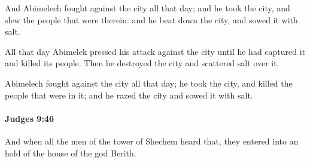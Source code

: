 			\begin{versebox}
					\item[BHS] 
					\item[ASV] And Abimelech fought against the city all that day; and he took the city, and slew the people that were therein: and he beat down the city, and sowed it with salt.
					\item[NIV] All that day Abimelek pressed his attack against the city until he had captured it and killed its people. Then he destroyed the city and scattered salt over it.
					\item[NRSV] Abimelech fought against the city all that day; he took the city, and killed the people that were in it; and he razed the city and sowed it with salt.
			\end{versebox}

		\paragraph{Judges 9:46} %
			\label{JUDGES-9-46}

			And when all the men of the tower of Shechem heard that, they entered into an hold of the house of the god Berith.

